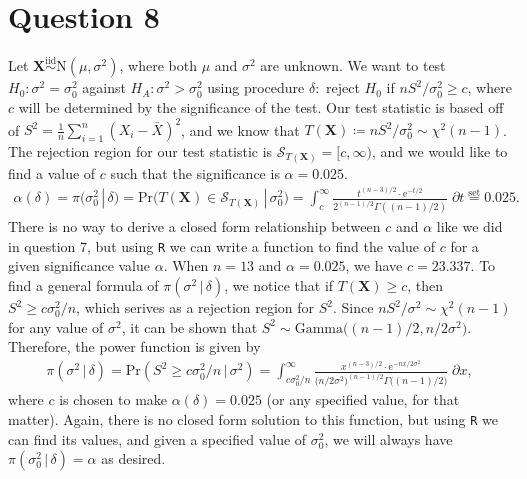 \documentclass[10pt]{article}
\begin{document}
\section{Question 8} \noindent
Let \(\bm{X} \overset{\mathrm{iid}}{\sim} \mathrm{N}(\mu, \sigma^2)\), where both \(\mu\) and \(\sigma^2\) are unknown. We want to test 
\(H_0 : \sigma^2 = \sigma^2_0\) against \(H_A : \sigma^2 > \sigma^2_0\) using procedure \(\delta :\) reject \(H_0\) if \(nS^2/\sigma^2_0 \ge c\), where \(c\) 
will be determined by the significance of the test. 
Our test statistic is based off of \(S^2 = \frac{1}{n} \sum_{i=1}^n (X_i - \bar{X})^2\), and we know that \(T(\bm{X}) \coloneqq nS^2 / \sigma^2_0 \sim \chi^2(n-1)\). 
The rejection region for our test statistic is \(\mathcal{S}_{T(\bm{X})} = [c, \infty)\), and we would like to find a value of \(c\) such that the significance
is \(\alpha = 0.025\). 
\begin{align*}
    \alpha(\delta)
    = \pi(\sigma^2_0 \,|\, \delta)
    = \mathrm{Pr} \big( T(\bm{X}) \in \mathcal{S}_{T(\bm{X})} \,|\, \sigma^2_0 \big)
    = \int_c^{\infty} \frac{t^{(n-3)/2} \cdot \mathrm{e}^{-t/2}}{2^{(n-1)/2} \Gamma \left( (n-1)/2 \right)} \;\partial t
    \overset{\mathrm{set}}{=} 0.025.
\end{align*}
There is no way to derive a closed form relationship between \(c\) and \(\alpha\) like we did in question 7, but using \texttt{R} we can write a function 
to find the value of \(c\) for a given significance value \(\alpha\). When \(n = 13\) and \(\alpha = 0.025\), we have \(c = 23.337\). To find a general 
formula of \(\pi(\sigma^2 \,|\, \delta)\), we notice that if \(T(\bm{X}) \ge c\), then \(S^2 \ge c \sigma^2_0 / n\), which serives as a rejection region for 
\(S^2\). Since \(n S^2 / \sigma^2 \sim \chi^2(n-1)\) for any value of \(\sigma^2\), it can be shown that \(S^2 \sim \mathrm{Gamma}\big( (n-1)/2, n / 2 \sigma^2\big)\).
Therefore, the power function is given by 
\begin{align*}
    \pi(\sigma^2 \,|\, \delta)
    = \mathrm{Pr} (S^2 \ge c \sigma^2_0 / n \,|\, \sigma^2)
    = \int_{c\sigma^2_0 / n}^{\infty} \frac{x^{(n - 3)/2} \cdot \mathrm{e}^{- nx/2 \sigma^2}}{\big( n / 2 \sigma^2 \big)^{(n-1)/2} \Gamma \big( (n-1)/2 \big)} \;\partial x,
\end{align*}
where \(c\) is chosen to make \(\alpha(\delta) = 0.025\) (or any specified value, for that matter). Again, there is no closed form solution to this function,
but using \texttt{R} we can find its values, and given a specified value of \(\sigma^2_0\), we will always have \(\pi(\sigma^2_0 \,|\, \delta) = \alpha\)
as desired. 
\end{document}
